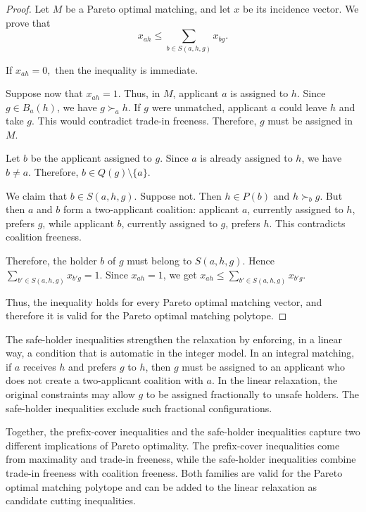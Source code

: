 \documentclass[12pt]{report}
\numberwithin{algorithm}{chapter}
\begin{document}
	\begin{proof}
		Let $M$ be a Pareto optimal matching, and let $x$ be its incidence vector. We prove that
		\[
		x_{ah}
		\le
		\sum_{b\in S(a,h,g)}x_{bg}.
		\]
		
		If
		$x_{ah}=0,$
		then the inequality is immediate.
		
		Suppose now that
		$x_{ah}=1.$
		Thus, in $M$, applicant $a$ is assigned to $h$. Since $g\in B_a(h)$, we have
		$g\succ_{a} h.$
		If $g$ were unmatched, applicant $a$ could leave $h$ and take $g$. This would contradict trade-in freeness. Therefore, $g$ must be assigned in $M$.
		
		Let $b$ be the applicant assigned to $g$. Since $a$ is already assigned to $h$, we have $b\ne a$. Therefore,
		$
		b\in Q(g)\setminus\{a\}.
		$
		
		We claim that $b\in S(a,h,g)$. Suppose not. Then $h\in P(b)$ and
		$
		h\succ_b g.
		$
		But then $a$ and $b$ form a two-applicant coalition: applicant $a$, currently assigned to $h$, prefers $g$, while applicant $b$, currently assigned to $g$, prefers $h$. This contradicts coalition freeness.
		
		Therefore, the holder $b$ of $g$ must belong to $S(a,h,g)$. Hence
		$
		\sum_{b'\in S(a,h,g)}x_{b'g}=1.
		$
		Since $x_{ah}=1$, we get
		$
		x_{ah}
		\le
		\sum_{b'\in S(a,h,g)}x_{b'g}.
		$
		
		Thus, the inequality holds for every Pareto optimal matching vector, and therefore it is valid for the Pareto optimal matching polytope.
	\end{proof}
	
	The safe-holder inequalities strengthen the relaxation by enforcing, in a linear way, a condition that is automatic in the integer model. In an integral matching, if $a$ receives $h$ and prefers $g$ to $h$, then $g$ must be assigned to an applicant who does not create a two-applicant coalition with $a$. In the linear relaxation, the original constraints may allow $g$ to be assigned fractionally to unsafe holders. The safe-holder inequalities exclude such fractional configurations.
	
	Together, the prefix-cover inequalities and the safe-holder inequalities capture two different implications of Pareto optimality. The prefix-cover inequalities come from maximality and trade-in freeness, while the safe-holder inequalities combine trade-in freeness with coalition freeness. Both families are valid for the Pareto optimal matching polytope and can be added to the linear relaxation as candidate cutting inequalities.
	
\end{document}
